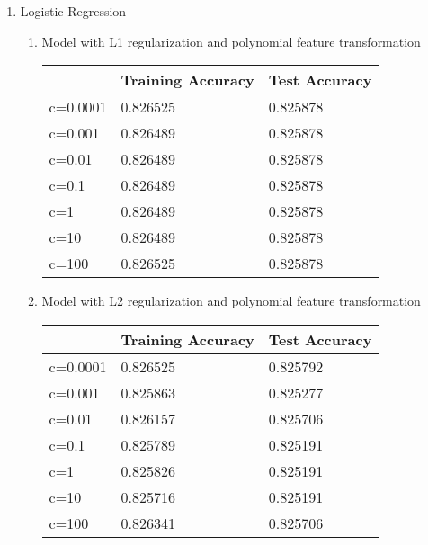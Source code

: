 \documentclass[12pt]{article}
\begin{document}
	\begin{enumerate}
		\item Logistic Regression
		\begin{enumerate}
			\item Model with L1 regularization and polynomial feature transformation
			
			\begin{center}
				\begin{tabular}{|l|l|l|}
					\hline
					& Training Accuracy & Test Accuracy \\ \hline
					c=0.0001 & 0.826525          & 0.825878      \\ \hline
					c=0.001  & 0.826489          & 0.825878      \\ \hline
					c=0.01   & 0.826489          & 0.825878      \\ \hline
					c=0.1    & 0.826489          & 0.825878      \\ \hline
					c=1      & 0.826489          & 0.825878      \\ \hline
					c=10     & 0.826489          & 0.825878      \\ \hline
					c=100    & 0.826525          & 0.825878      \\ \hline
				\end{tabular}
			\end{center}
		
		\item Model with L2 regularization and polynomial feature transformation
		
		\begin{center}
			\begin{tabular}{|l|l|l|}
				\hline
				& Training Accuracy & Test Accuracy \\ \hline
				c=0.0001 & 0.826525          & 0.825792      \\ \hline
				c=0.001  & 0.825863          & 0.825277      \\ \hline
				c=0.01   & 0.826157          & 0.825706      \\ \hline
				c=0.1    & 0.825789          & 0.825191      \\ \hline
				c=1      & 0.825826          & 0.825191      \\ \hline
				c=10     & 0.825716          & 0.825191      \\ \hline
				c=100    & 0.826341          & 0.825706      \\ \hline
			\end{tabular}
		\end{center}
	

\end{enumerate}
\end{enumerate}
\end{document}
